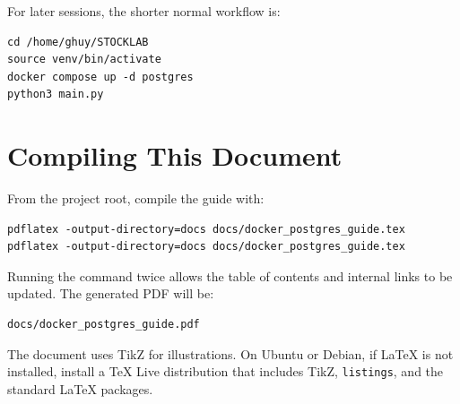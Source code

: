 \documentclass[11pt,a4paper]{article}
\begin{document}
For later sessions, the shorter normal workflow is:

\begin{lstlisting}[style=terminal]
cd /home/ghuy/STOCKLAB
source venv/bin/activate
docker compose up -d postgres
python3 main.py
\end{lstlisting}

\section{Compiling This Document}

From the project root, compile the guide with:

\begin{lstlisting}[style=terminal]
pdflatex -output-directory=docs docs/docker_postgres_guide.tex
pdflatex -output-directory=docs docs/docker_postgres_guide.tex
\end{lstlisting}

Running the command twice allows the table of contents and internal links to be
updated. The generated PDF will be:

\begin{lstlisting}[style=terminal]
docs/docker_postgres_guide.pdf
\end{lstlisting}

The document uses TikZ for illustrations. On Ubuntu or Debian, if LaTeX is not
installed, install a TeX Live distribution that includes TikZ, \texttt{listings},
and the standard LaTeX packages.
\end{document}
